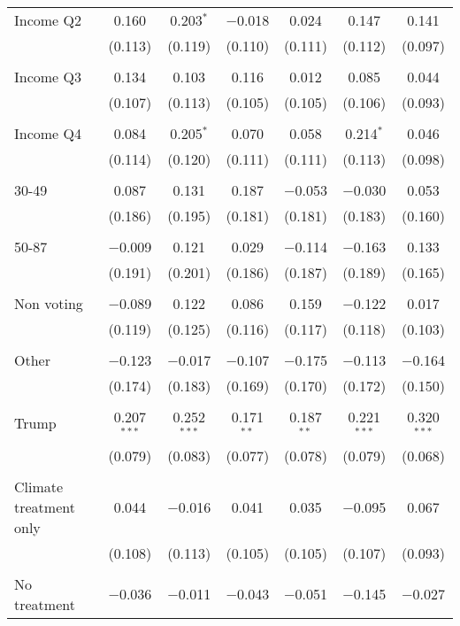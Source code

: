 \begin{tabular}{@{\extracolsep{5pt}}lcccccc}
 Income Q2 & 0.160 & 0.203$^{*}$ & $-$0.018 & 0.024 & 0.147 & 0.141 \\ 
  & (0.113) & (0.119) & (0.110) & (0.111) & (0.112) & (0.097) \\ 
  & & & & & & \\ 
 Income Q3 & 0.134 & 0.103 & 0.116 & 0.012 & 0.085 & 0.044 \\ 
  & (0.107) & (0.113) & (0.105) & (0.105) & (0.106) & (0.093) \\ 
  & & & & & & \\ 
 Income Q4 & 0.084 & 0.205$^{*}$ & 0.070 & 0.058 & 0.214$^{*}$ & 0.046 \\ 
  & (0.114) & (0.120) & (0.111) & (0.111) & (0.113) & (0.098) \\ 
  & & & & & & \\ 
 30-49 & 0.087 & 0.131 & 0.187 & $-$0.053 & $-$0.030 & 0.053 \\ 
  & (0.186) & (0.195) & (0.181) & (0.181) & (0.183) & (0.160) \\ 
  & & & & & & \\ 
 50-87 & $-$0.009 & 0.121 & 0.029 & $-$0.114 & $-$0.163 & 0.133 \\ 
  & (0.191) & (0.201) & (0.186) & (0.187) & (0.189) & (0.165) \\ 
  & & & & & & \\ 
 Non voting & $-$0.089 & 0.122 & 0.086 & 0.159 & $-$0.122 & 0.017 \\ 
  & (0.119) & (0.125) & (0.116) & (0.117) & (0.118) & (0.103) \\ 
  & & & & & & \\ 
 Other & $-$0.123 & $-$0.017 & $-$0.107 & $-$0.175 & $-$0.113 & $-$0.164 \\ 
  & (0.174) & (0.183) & (0.169) & (0.170) & (0.172) & (0.150) \\ 
  & & & & & & \\ 
 Trump & 0.207$^{***}$ & 0.252$^{***}$ & 0.171$^{**}$ & 0.187$^{**}$ & 0.221$^{***}$ & 0.320$^{***}$ \\ 
  & (0.079) & (0.083) & (0.077) & (0.078) & (0.079) & (0.068) \\ 
  & & & & & & \\ 
 Climate treatment only & 0.044 & $-$0.016 & 0.041 & 0.035 & $-$0.095 & 0.067 \\ 
  & (0.108) & (0.113) & (0.105) & (0.105) & (0.107) & (0.093) \\ 
  & & & & & & \\ 
 No treatment & $-$0.036 & $-$0.011 & $-$0.043 & $-$0.051 & $-$0.145 & $-$0.027 \\ 

\end{tabular}

